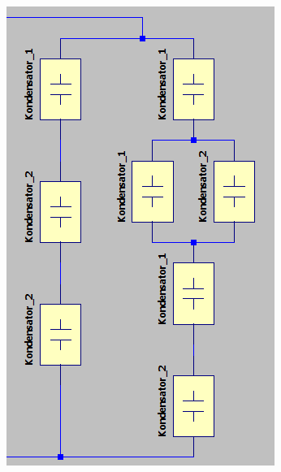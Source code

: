 \documentclass[10pt,a4paper]{article}
\begin{document}
\begin{flushleft}
\newpage
\begin{figure}[H]
\centering
\begin{subfigure}{0.5\linewidth}
\centering
\includegraphics[scale=0.4]{V10_Konds}
\label{fig:schalt_v10_konds}
\end{subfigure}%


\end{figure}
\end{flushleft}
\end{document}
